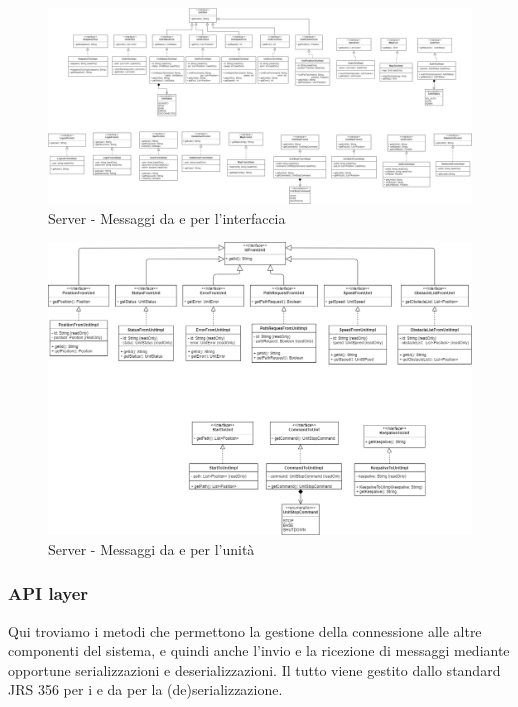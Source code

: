 \begin{landscape}
    \begin{figure}[H]
        \centering
        \includegraphics[width=23cm]{img/server_from_to_ui.png}
        \caption{Server - Messaggi da e per l'interfaccia}
    \end{figure}
\end{landscape}
\begin{landscape}
    \begin{figure}[H]
        \centering
        \includegraphics[width=22cm]{img/server_from_to_unit.png}
        \caption{Server - Messaggi da e per l'unità}
    \end{figure}
\end{landscape}

\subsubsection{API layer}
Qui troviamo i metodi che permettono la gestione della connessione alle altre componenti del sistema, e quindi anche l'invio e la ricezione di messaggi mediante opportune serializzazioni e deserializzazioni. Il tutto viene gestito dallo standard JRS 356 per i  e da  per la (de)serializzazione.

